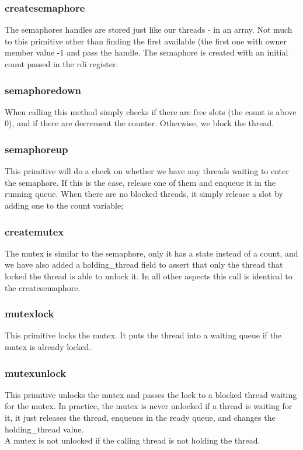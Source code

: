 \subsubsection*{createsemaphore}
The semaphores handles are stored just like our threads - in an array. Not much to this primitive other than finding the first available (the first one with owner member value -1 and pass the handle. The semaphore is created with an initial count passed in the rdi register.
\subsubsection*{semaphoredown}
When calling this method simply checks if there are free slots (the count is above 0), and if there are decrement the counter. Otherwise, we block the thread.
\subsubsection*{semaphoreup}
This primitive will do a check on whether we have any threads waiting to enter the semaphore. If this is the case, release one of them and enqueue it in the running queue. When there are no blocked threads, it simply release a slot by adding one to the count variable;

\subsubsection*{createmutex}
The mutex is similar to the semaphore, only it has a state instead of a count, and we have also added a holding\_thread field to assert that only 
the thread that locked the thread is able to unlock it. In all other aspects this call is identical to the createsemaphore.

\subsubsection*{mutexlock}
This primitive locks the mutex. It puts the thread into a waiting queue if the mutex is already locked.
\subsubsection*{mutexunlock}
This primitive unlocks the mutex and passes the lock to a blocked thread waiting for the mutex. In practice, the mutex is never unlocked if a thread is waiting for it, it just releases the thread, enqueues in the ready queue, and changes the holding\_thread value.\\
A mutex is not unlocked if the calling thread is not holding the thread.

